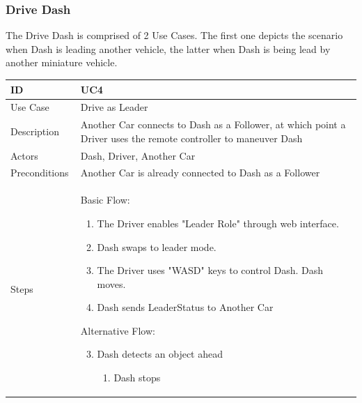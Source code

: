 \documentclass[12pt]{article}
\begin{document}
\subsubsection{Drive Dash}\label{us:drive car}
The Drive Dash is comprised of 2 Use Cases. The first one depicts the scenario when Dash is leading another vehicle, the latter when Dash is being lead by another miniature vehicle.
\begin{longtable}{| p{0.2\linewidth} | p{0.8\linewidth} |}\hline 
    ID & UC4\\ \hline
    Use Case & Drive as Leader\\ \hline
    Description & Another Car connects to Dash as a Follower, at which point a Driver uses the remote controller to maneuver Dash\\ \hline
    Actors & Dash, Driver, Another Car\\ \hline
    Preconditions & Another Car is already connected to Dash as a Follower\\ \hline
    Steps & Basic Flow: \begin{enumerate} %
        \itemsep 0em %
    	\item The Driver enables "Leader Role" through web interface.
        \item Dash swaps to leader mode.
        \item The Driver uses "WASD" keys to control Dash. Dash moves.
        \item Dash sends LeaderStatus to Another Car
	\end{enumerate}
    Alternative Flow: \begin{enumerate}
        	\setcounter{enumi}{2} %
        	\item Dash detects an object ahead 
            \begin{enumerate} %
            	\itemsep 0em %
         		\item Dash stops
       		\end{enumerate}
       	\end{enumerate}\\ \hline
\end{longtable}
\end{document}
